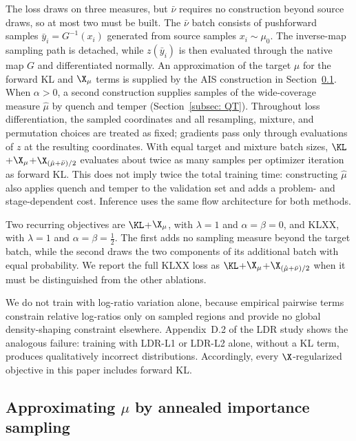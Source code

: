 \documentclass{article}
\begin{document}
The loss draws on three measures, but $\bar\nu$ requires no construction beyond source draws, so at most two must be built. The $\bar\nu$ batch consists of pushforward samples $\bar y_i = G^{-1}(x_i)$ generated from source samples $x_i \sim \mu_0$. The inverse-map sampling path is detached, while $z(\bar y_i)$ is then evaluated through the native map $G$ and differentiated normally. An approximation of the target $\mu$ for the forward KL and $\X_\mu$ terms is supplied by the AIS construction in Section~\ref{subsec: annealing}. When $\alpha>0$, a second construction supplies samples of the wide-coverage measure $\hat\mu$ by quench and temper (Section~\ref{subsec: QT}). Throughout loss differentiation, the sampled coordinates and all resampling, mixture, and permutation choices are treated as fixed; gradients pass only through evaluations of $z$ at the resulting coordinates. With equal target and mixture batch sizes, $\KL$+$\X_\mu$+$\X_{(\hat\mu+\bar\nu)/2}$ evaluates about twice as many samples per optimizer iteration as forward KL. This does not imply twice the total training time: constructing $\hat\mu$ also applies quench and temper to the validation set and adds a problem- and stage-dependent cost. Inference uses the same flow architecture for both methods.

Two recurring objectives are $\KL$+$\X_\mu$, with $\lambda=1$ and $\alpha=\beta=0$, and KLXX, with $\lambda=1$ and $\alpha=\beta=\frac12$. The first adds no sampling measure beyond the target batch, while the second draws the two components of its additional batch with equal probability. We report the full KLXX loss as $\KL$+$\X_\mu$+$\X_{(\hat\mu+\bar\nu)/2}$ when it must be distinguished from the other ablations.

We do not train with log-ratio variation alone, because empirical pairwise terms constrain relative log-ratios only on sampled regions and provide no global density-shaping constraint elsewhere. Appendix~D.2 of the LDR study \citep{schopmans2026ldr} shows the analogous failure: training with LDR-L1 or LDR-L2 alone, without a KL term, produces qualitatively incorrect distributions. Accordingly, every $\X$-regularized objective in this paper includes forward KL.

\subsection{Approximating $\mu$ by annealed importance sampling}
\label{subsec: annealing}
\end{document}
